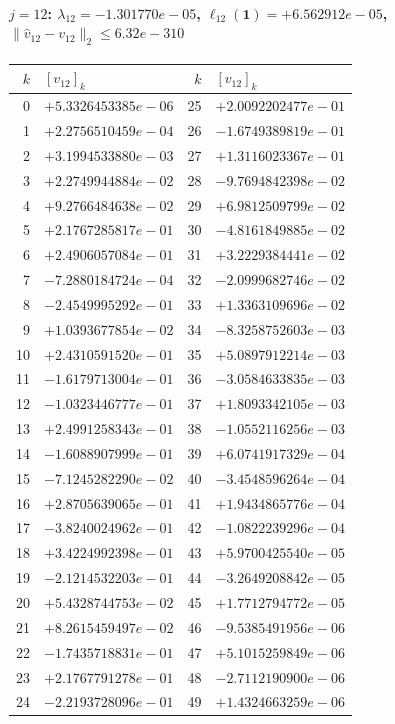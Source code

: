 \paragraph{$j = 12$: $\lambda_{12} = -1.301770e-05$, \quad $\ell_{12}(\mathbf{1}) = +6.562912e-05$, \quad $\|\hat{v}_{12} - v_{12}\|_2 \leq 6.32e-310$}
\begin{center}
{\footnotesize
\begin{tabular}{r@{\;\;}l@{\quad}r@{\;\;}l}
\toprule
$k$ & $[v_{12}]_k$ & $k$ & $[v_{12}]_k$ \\
\midrule
0 & $+5.3326453385e-06$ & 25 & $+2.0092202477e-01$ \\
1 & $+2.2756510459e-04$ & 26 & $-1.6749389819e-01$ \\
2 & $+3.1994533880e-03$ & 27 & $+1.3116023367e-01$ \\
3 & $+2.2749944884e-02$ & 28 & $-9.7694842398e-02$ \\
4 & $+9.2766484638e-02$ & 29 & $+6.9812509799e-02$ \\
5 & $+2.1767285817e-01$ & 30 & $-4.8161849885e-02$ \\
6 & $+2.4906057084e-01$ & 31 & $+3.2229384441e-02$ \\
7 & $-7.2880184724e-04$ & 32 & $-2.0999682746e-02$ \\
8 & $-2.4549995292e-01$ & 33 & $+1.3363109696e-02$ \\
9 & $+1.0393677854e-02$ & 34 & $-8.3258752603e-03$ \\
10 & $+2.4310591520e-01$ & 35 & $+5.0897912214e-03$ \\
11 & $-1.6179713004e-01$ & 36 & $-3.0584633835e-03$ \\
12 & $-1.0323446777e-01$ & 37 & $+1.8093342105e-03$ \\
13 & $+2.4991258343e-01$ & 38 & $-1.0552116256e-03$ \\
14 & $-1.6088907999e-01$ & 39 & $+6.0741917329e-04$ \\
15 & $-7.1245282290e-02$ & 40 & $-3.4548596264e-04$ \\
16 & $+2.8705639065e-01$ & 41 & $+1.9434865776e-04$ \\
17 & $-3.8240024962e-01$ & 42 & $-1.0822239296e-04$ \\
18 & $+3.4224992398e-01$ & 43 & $+5.9700425540e-05$ \\
19 & $-2.1214532203e-01$ & 44 & $-3.2649208842e-05$ \\
20 & $+5.4328744753e-02$ & 45 & $+1.7712794772e-05$ \\
21 & $+8.2615459497e-02$ & 46 & $-9.5385491956e-06$ \\
22 & $-1.7435718831e-01$ & 47 & $+5.1015259849e-06$ \\
23 & $+2.1767791278e-01$ & 48 & $-2.7112190900e-06$ \\
24 & $-2.2193728096e-01$ & 49 & $+1.4324663259e-06$ \\
\bottomrule
\end{tabular}
}
\end{center}

